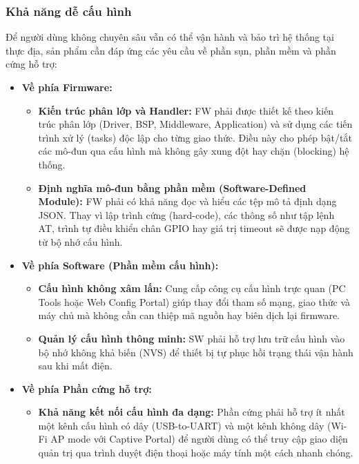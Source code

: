         \subsubsection{Khả năng dễ cấu hình}
            Để người dùng không chuyên sâu vẫn có thể vận hành và bảo trì hệ thống tại thực địa, sản phẩm cần đáp ứng các yêu cầu về phần sụn, phần mềm và phần cứng hỗ trợ:
            \begin{itemize}
                \item \textbf{Về phía Firmware:}
                \begin{itemize}
                    \item \textbf{Kiến trúc phân lớp và Handler:} FW phải được thiết kế theo kiến trúc phân lớp (Driver, BSP, Middleware, Application) và sử dụng các tiến trình xử lý (tasks) độc lập cho từng giao thức. Điều này cho phép bật/tắt các mô-đun qua cấu hình mà không gây xung đột hay chặn (blocking) hệ thống.
                    \item \textbf{Định nghĩa mô-đun bằng phần mềm (Software-Defined Module):} FW phải có khả năng đọc và hiểu các tệp mô tả định dạng JSON. Thay vì lập trình cứng (hard-code), các thông số như tập lệnh AT, trình tự điều khiển chân GPIO hay giá trị timeout sẽ được nạp động từ bộ nhớ cấu hình.
                \end{itemize}
                
                \item \textbf{Về phía Software (Phần mềm cấu hình):}
                \begin{itemize}
                    \item \textbf{Cấu hình không xâm lấn:} Cung cấp công cụ cấu hình trực quan (PC Tools hoặc Web Config Portal) giúp thay đổi tham số mạng, giao thức và máy chủ mà không cần can thiệp mã nguồn hay biên dịch lại firmware.
                    \item \textbf{Quản lý cấu hình thông minh:} SW phải hỗ trợ lưu trữ cấu hình vào bộ nhớ không khả biến (NVS) để thiết bị tự phục hồi trạng thái vận hành sau khi mất điện.
                \end{itemize}

                \item \textbf{Về phía Phần cứng hỗ trợ:}
                \begin{itemize}
                    \item \textbf{Khả năng kết nối cấu hình đa dạng:} Phần cứng phải hỗ trợ ít nhất một kênh cấu hình có dây (USB-to-UART) và một kênh không dây (Wi-Fi AP mode với Captive Portal) để người dùng có thể truy cập giao diện quản trị qua trình duyệt điện thoại hoặc máy tính một cách nhanh chóng.
                \end{itemize}
            \end{itemize}


